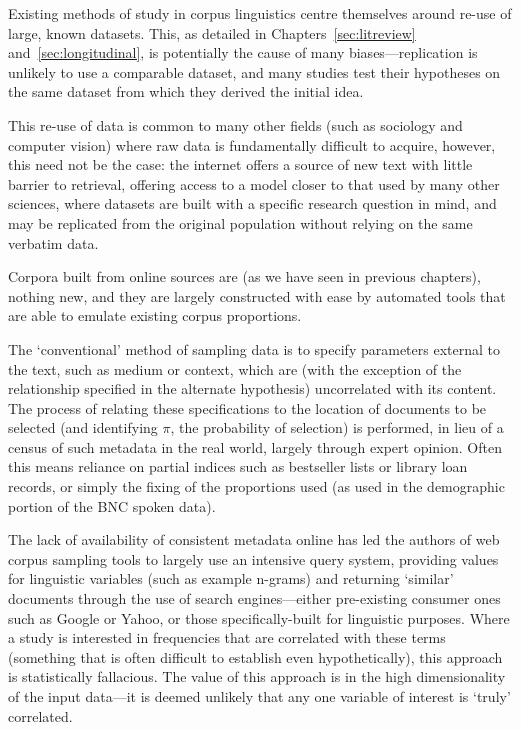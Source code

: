 

Existing methods of study in corpus linguistics centre themselves around re-use of large, known datasets.  This, as detailed in Chapters~\ref{sec:litreview} and~\ref{sec:longitudinal}, is potentially the cause of many biases---replication is unlikely to use a comparable dataset, and many studies test their hypotheses on the same dataset from which they derived the initial idea.

This re-use of data is common to many other fields (such as sociology\cite{mcgrath1986british} and computer vision\cite{griffin2007caltech}) where raw data is fundamentally difficult to acquire, however, this need not be the case: the internet offers a source of new text with little barrier to retrieval, offering access to a model closer to that used by many other sciences, where datasets are built with a specific research question in mind, and may be replicated from the original population without relying on the same verbatim data.

Corpora built from online sources are (as we have seen in previous chapters), nothing new, and they are largely constructed with ease by automated tools that are able to emulate existing corpus proportions.

The `conventional' method of sampling data is to specify parameters external to the text, such as medium or context, which are (with the exception of the relationship specified in the alternate hypothesis) uncorrelated with its content.  The process of relating these specifications to the location of documents to be selected (and identifying $\pi$, the probability of selection) is performed, in lieu of a census of such metadata in the real world, largely through expert opinion.  Often this means reliance on partial indices such as bestseller lists or library loan records, or simply the fixing of the proportions used (as used in the demographic portion of the BNC spoken data).


The lack of availability of consistent metadata online has led the authors of web corpus sampling tools to largely use an intensive query system, providing values for linguistic variables (such as example n-grams) and returning `similar' documents through the use of search engines---either pre-existing consumer ones such as Google or Yahoo, or those specifically-built for linguistic purposes.  Where a study is interested in frequencies that are correlated with these terms (something that is often difficult to establish even hypothetically), this approach is statistically fallacious.  The value of this approach is in the high dimensionality of the input data---it is deemed unlikely that any one variable of interest is `truly' correlated.


